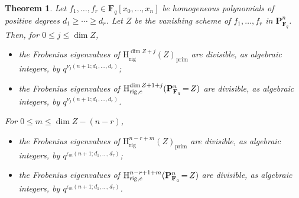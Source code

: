 \documentclass{amsart}
\numberwithin{equation}{section}
\theoremstyle{plain}
\newtheorem{theorem}[equation]{Theorem}
\theoremstyle{definition}
\renewcommand{\mathbb}{\mathbf}
\renewcommand{\setminus}{\mathbin{\rule[0.2em]{0.67em}{0.12em}}}%
\begin{document}
\begin{theorem}%
  \label{theorem:projective-bound}
  Let \(f_1,\ldots,f_r \in \mathbb{F}_{q}[x_0,\ldots,x_n]\)
  be homogeneous polynomials of positive degrees \(d_1 \geq \cdots \geq d_r\). Let \(Z\) be the vanishing scheme of \(f_1,\ldots,f_r\)
  in \(\mathbb{P}^n_{\mathbb{F}_q}\).
  Then, for \(0\leq j\leq \dim Z\),
  \begin{itemize}
  \item the Frobenius eigenvalues of \(\mathrm{H}^{\dim Z+j}_{\mathrm{rig}}(Z)_{\mathrm{prim}}\)
    are divisible, as algebraic integers, by \(q^{\nu_j(n+1;d_1,\ldots,d_r)}\);
  \item the Frobenius eigenvalues of
    \(\mathrm{H}^{\dim Z+1+j}_{\mathrm{rig},c}(\mathbb{P}^n_{\mathbb{F}_q}\setminus Z)\) are divisible, as
    algebraic integers, by \(q^{\nu_{j}(n+1;d_1,\ldots,d_r)}\).
  \end{itemize}
  For \(0 \leq m \leq  \dim Z - (n-r)\),
  \begin{itemize}
  \item the Frobenius eigenvalues of \(\mathrm{H}^{n-r+m}_{\mathrm{rig}}(Z)_{\mathrm{prim}}\)
    are divisible, as algebraic integers, by \(q^{\epsilon_{m}(n+1;d_1,\ldots,d_r)}\);
  \item the Frobenius eigenvalues of
    \(\mathrm{H}^{n-r+1+m}_{\mathrm{rig},c}(\mathbb{P}^n_{\mathbb{F}_q}\setminus Z)\) are divisible, as
    algebraic integers, by \(q^{\epsilon_{m}(n+1;d_1,\ldots,d_r)}\).

  \end{itemize}
\end{theorem}




\end{document}

